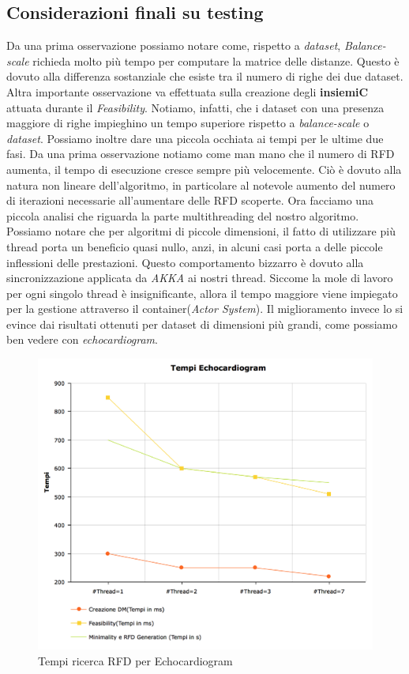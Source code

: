 \subsection{Considerazioni finali su testing}
Da una prima osservazione possiamo notare come, rispetto a \textit{dataset}, \textit{Balance-scale} richieda molto più tempo per computare la matrice delle distanze. Questo è dovuto alla differenza sostanziale che esiste tra il numero di righe dei due dataset. 
Altra importante osservazione va effettuata sulla creazione degli \textbf{insiemiC} attuata durante il \emph{Feasibility}. Notiamo, infatti, che i dataset con una presenza maggiore di righe impieghino un tempo superiore rispetto a \emph{balance-scale} o \emph{dataset}.
Possiamo inoltre dare una piccola occhiata ai tempi per le ultime due fasi.
Da una prima osservazione notiamo come man mano che il numero di RFD aumenta, il tempo di esecuzione cresce sempre più velocemente. Ciò è dovuto alla natura non lineare dell'algoritmo, in particolare al notevole aumento del numero di iterazioni necessarie all'aumentare delle RFD scoperte.
Ora facciamo una piccola analisi che riguarda la parte multithreading del nostro algoritmo.
Possiamo notare che per algoritmi di piccole dimensioni, il fatto di utilizzare più thread porta un beneficio quasi nullo, anzi, in alcuni casi porta a delle piccole inflessioni delle prestazioni. Questo comportamento bizzarro è dovuto alla sincronizzazione applicata da \emph{AKKA} ai nostri thread. Siccome la mole di lavoro per ogni singolo thread è insignificante, allora il tempo maggiore viene impiegato per la gestione attraverso il container(\emph{Actor System}).
Il miglioramento invece lo si evince dai risultati ottenuti per dataset di dimensioni più grandi, come possiamo ben vedere con \emph{echocardiogram}.
\begin{figure}[H]
	\centering
	\includegraphics[scale = 0.4]{Immagini/GraficoEchocardiogram.png}
	\caption{Tempi ricerca RFD per Echocardiogram}
	\label{fig:tempi_Echocardiogram}
\end{figure}